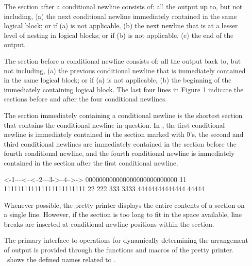 The section after a conditional newline consists of: all the output up to,
but not including, (a) the next conditional newline immediately contained
in the same logical block; or if (a) is not applicable, (b) the next
newline that is at a lesser level of nesting in logical blocks; or if (b)
is not applicable, (c) the end of the output.
 
The section before a conditional newline consists of: all the output back
to, but not including, (a) the previous conditional newline that is
immediately contained in the same logical block; or if (a) is not
applicable, (b) the beginning of the immediately containing logical block.
The last four lines in Figure 1 indicate the sections before and after the
four conditional newlines.
 
The section immediately containing a conditional newline is the shortest
section that contains the conditional newline in question.  In \thenextfigure,
the first conditional newline is immediately contained in the section
marked with \f{0}'s, the second and third conditional newlines are immediately
contained in the section before the fourth conditional newline, and the
fourth conditional newline is immediately contained in the section after
the first conditional newline.
 
\code
 <-1---<--<--2---3->--4-->->
 000000000000000000000000000
 11 111111111111111111111111
           22 222
              333 3333
        44444444444444 44444
\endcode
{}
 
Whenever possible, the pretty printer displays the entire contents of a
section on a single line.  However, if the section is too long to fit in
the space available, line breaks are inserted at conditional newline
positions within the section.

\endsubsubsection%


The primary interface to operations for dynamically determining the
arrangement of output is provided through the functions and macros of the
pretty printer.  \Thenextfigure\ shows the defined names related to .


